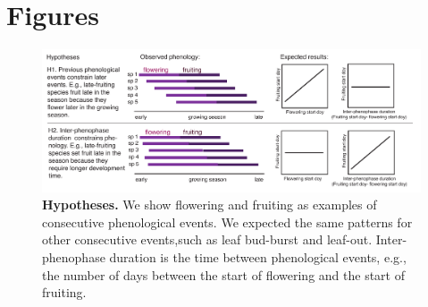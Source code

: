 \documentclass{article}
\begin{document}
\section* {Figures}
\begin{figure}[p]
  \centering
  \includegraphics{../analyses/figures/hypotheses3.pdf} 
  \caption{\textbf{Hypotheses.} We show flowering and fruiting as examples of consecutive phenological events. We expected the same patterns for other consecutive events,such as leaf bud-burst and leaf-out. Inter-phenophase duration is the time between phenological events, e.g., the number of days between the start of flowering and the start of fruiting.} 
 \label{fig:hyp}
\end{figure}
 
\end{document}
